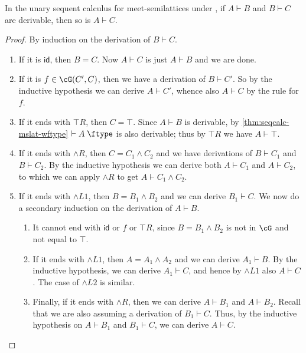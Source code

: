 \documentclass{book}
\def\idfunc{\mathsf{id}}
\let\types\vdash
\def\type{\;\ftype}
\let\meet\wedge
\def\meetL{\mathord{\meet}L}
\def\meetR{\mathord{\meet}R}
\begin{document}
\begin{thm}\label{thm:seqcalc-mslat-cutadm}
  In the unary sequent calculus for meet-semilattices under \cG, if $A\types B$ and $B\types C$ are derivable, then so is $A\types C$.
\end{thm}
\begin{proof}
  By induction on the derivation of $B\types C$.
  \begin{enumerate}
  \item If it is $\idfunc$, then $B=C$.
    Now $A\types C$ is just $A\types B$ and we are done.
  \item If it is $f\in\cG(C',C)$, then we have a derivation of $B\types C'$.
    So by the inductive hypothesis we can derive $A\types C'$, whence also $A\types C$ by the rule for $f$.
  \item If it ends with $\top R$, then $C=\top$.
    Since $A\types B$ is derivable, by \cref{thm:seqcalc-mslat-wftype} $\types A\type$ is also derivable; thus by $\top R$ we have $A\types \top$.
  \item If it ends with $\meetR$, then $C=C_1\meet C_2$ and we have derivations of $B\types C_1$ and $B\types C_2$.
    By the inductive hypothesis we can derive both $A\types C_1$ and $A\types C_2$, to which we can apply $\meetR$ to get $A\types C_1\meet C_2$.
  \item If it ends with $\meetL1$, then $B=B_1\meet B_2$ and we can derive $B_1\types C$.
    We now do a secondary induction on the derivation of $A\types B$.
    \begin{enumerate}
    \item It cannot end with $\idfunc$ or $f$ or $\top R$, since $B=B_1\meet B_2$ is not in $\cG$ and not equal to $\top$.
    \item If it ends with $\meetL1$, then $A=A_1\meet A_2$ and we can derive $A_1\types B$.
      By the inductive hypothesis, we can derive $A_1 \types C$, and hence by $\meetL1$ also $A \types C$.
      The case of $\meetL2$ is similar.
    \item Finally, if it ends with $\meetR$, then we can derive $A\types B_1$ and $A\types B_2$.
      Recall that we are also assuming a derivation of $B_1\types C$.
      Thus, by the inductive hypothesis on $A\types B_1$ and $B_1\types C$, we can derive $A\types C$.
      \label{item:mslat-principal-cut}\qedhere
    \end{enumerate}
  \end{enumerate}
\end{proof}
\end{document}
